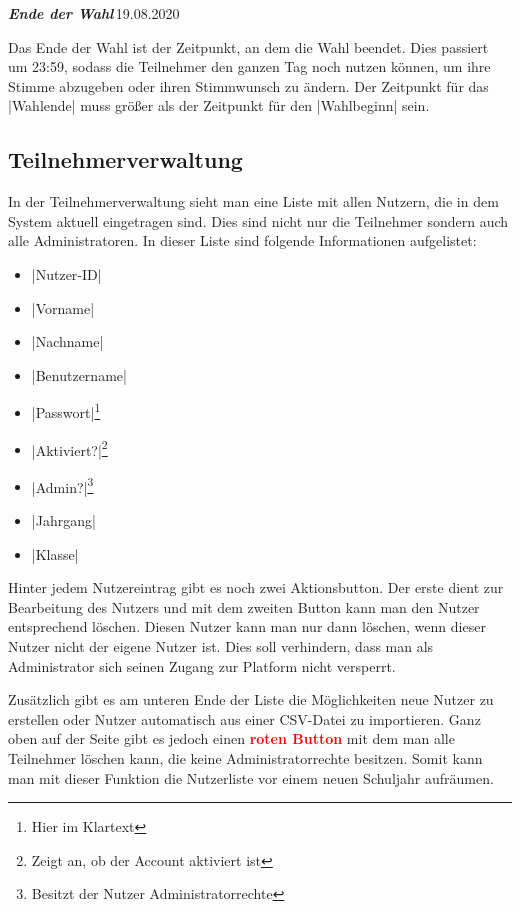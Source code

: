 \documentclass[ngerman]{ltxdoc}
\newcommand{\DescribeOption}[4]{
  \DescribeMacro{#1}
  \begin{minipage}[t]{\textwidth}
    \textit{\textbf{\textcolor{mLightGreen}{#2}}}\dotfill\,#3\par
    \begingroup
    \vspace{0.5em}#4\par
    \endgroup
  \end{minipage}
}
\begin{document}
\DescribeOption{Wahlende}{Ende der Wahl}{19.08.2020}{
  Das Ende der Wahl ist der Zeitpunkt, an dem die Wahl beendet. Dies passiert
  um 23:59, sodass die Teilnehmer den ganzen Tag noch nutzen können, um ihre Stimme
  abzugeben oder ihren Stimmwunsch zu ändern. Der Zeitpunkt für das |Wahlende| muss
  größer als der Zeitpunkt für den |Wahlbeginn| sein.
}

\subsection{Teilnehmerverwaltung}

In der Teilnehmerverwaltung sieht man eine Liste mit allen Nutzern, die in dem
System aktuell eingetragen sind. Dies sind nicht nur die Teilnehmer sondern auch
alle Administratoren. In dieser Liste sind folgende Informationen aufgelistet:

\begin{multicols}{3}
  \begin{itemize}
    \item |Nutzer-ID|
    \item |Vorname|
    \item |Nachname|
    \item |Benutzername|
    \item |Passwort|\footnote{Hier im Klartext}
    \item |Aktiviert?|\footnote{Zeigt an, ob der Account aktiviert ist}
    \item |Admin?|\footnote{Besitzt der Nutzer Administratorrechte}
    \item |Jahrgang|
    \item |Klasse|
  \end{itemize}
\end{multicols}

Hinter jedem Nutzereintrag gibt es noch zwei Aktionsbutton. Der erste dient zur
Bearbeitung des Nutzers und mit dem zweiten Button kann man den Nutzer entsprechend
löschen. Diesen Nutzer kann man nur dann löschen, wenn dieser Nutzer nicht der
eigene Nutzer ist. Dies soll verhindern, dass man als Administrator sich seinen
Zugang zur Platform nicht versperrt.

Zusätzlich gibt es am unteren Ende der Liste die Möglichkeiten neue Nutzer zu erstellen oder Nutzer
automatisch aus einer CSV-Datei zu importieren. Ganz oben auf der Seite gibt es
jedoch einen \textcolor{red}{\textbf{roten Button}} mit dem man alle Teilnehmer
löschen kann, die keine Administratorrechte besitzen. Somit kann man mit dieser
Funktion die Nutzerliste vor einem neuen Schuljahr aufräumen.
\end{document}
